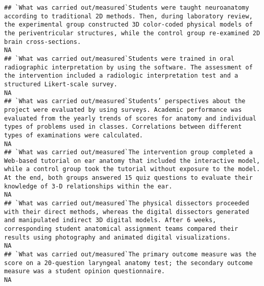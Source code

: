 \documentclass[]{article}
\begin{document}
\begin{verbatim}
## `What was carried out/measured`Students were taught neuroanatomy according to traditional 2D methods. Then, during laboratory review, the experimental group constructed 3D color-coded physical models of the periventricular structures, while the control group re-examined 2D brain cross-sections.                                                                                                                                                                               NA
## `What was carried out/measured`Students were trained in oral radiographic interpretation by using the software. The assessment of the intervention included a radiologic interpretation test and a structured Likert-scale survey.                                                                                                                                                                                                                                                    NA
## `What was carried out/measured`Students’ perspectives about the project were evaluated by using surveys. Academic performance was evaluated from the yearly trends of scores for anatomy and individual types of problems used in classes. Correlations between different types of examinations were calculated.                                                                                                                                                                      NA
## `What was carried out/measured`The intervention group completed a Web-based tutorial on ear anatomy that included the interactive model, while a control group took the tutorial without exposure to the model. At the end, both groups answered 15 quiz questions to evaluate their knowledge of 3-D relationships within the ear.                                                                                                                                                   NA
## `What was carried out/measured`The physical dissectors proceeded with their direct methods, whereas the digital dissectors generated and manipulated indirect 3D digital models. After 6 weeks, corresponding student anatomical assignment teams compared their results using photography and animated digital visualizations.                                                                                                                                                       NA
## `What was carried out/measured`The primary outcome measure was the score on a 20-question laryngeal anatomy test; the secondary outcome measure was a student opinion questionnaire.                                                                                                                                                                                                                                                                                                  NA

\end{verbatim}
\end{document}
